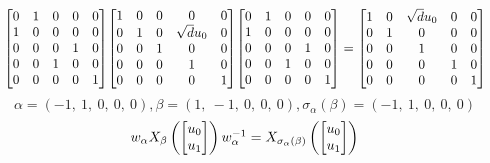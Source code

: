 \documentclass[11pt]{article}
\theoremstyle{definition}
\begin{document}
\[
\scaletoalign{\textwidth}{{\left[\begin{matrix}0 & 1 & 0 & 0 & 0\\1 & 0 & 0 & 0 & 0\\0 & 0 & 0 & 1 & 0\\0 & 0 & 1 & 0 & 0\\0 & 0 & 0 & 0 & 1\end{matrix}\right]} {\left[\begin{matrix}1 & 0 & 0 & 0 & 0\\0 & 1 & 0 & \sqrt{d} u_{0} & 0\\0 & 0 & 1 & 0 & 0\\0 & 0 & 0 & 1 & 0\\0 & 0 & 0 & 0 & 1\end{matrix}\right]} {\left[\begin{matrix}0 & 1 & 0 & 0 & 0\\1 & 0 & 0 & 0 & 0\\0 & 0 & 0 & 1 & 0\\0 & 0 & 1 & 0 & 0\\0 & 0 & 0 & 0 & 1\end{matrix}\right]} = {\left[\begin{matrix}1 & 0 & \sqrt{d} u_{0} & 0 & 0\\0 & 1 & 0 & 0 & 0\\0 & 0 & 1 & 0 & 0\\0 & 0 & 0 & 1 & 0\\0 & 0 & 0 & 0 & 1\end{matrix}\right]}}
\]
\[
\alpha = \left( -1, \  1, \  0, \  0, \  0\right), \beta = \left( 1, \  -1, \  0, \  0, \  0\right), \sigma_{\alpha}(\beta) = \left( -1, \  1, \  0, \  0, \  0\right)
\]
\[
\scaletoalign{\textwidth}{w_{\alpha} X_{\beta}\left(\left[\begin{matrix}u_{0}\\u_{1}\end{matrix}\right]\right) w_{\alpha}^{-1} = X_{\sigma_{\alpha}\left(\beta\right)}\left(\left[\begin{matrix}u_{0}\\u_{1}\end{matrix}\right]\right)}
\]
\end{document}
